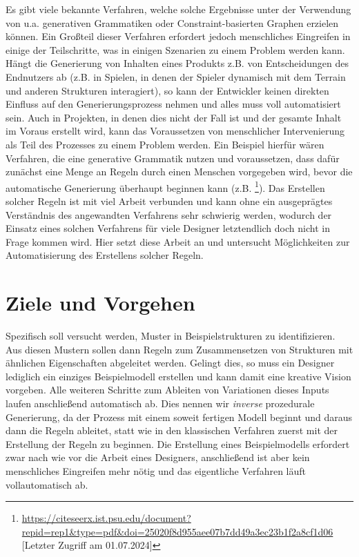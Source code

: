 Es gibt viele bekannte Verfahren, welche solche Ergebnisse unter der Verwendung von u.a. generativen
Grammatiken oder Constraint-basierten Graphen erzielen können. \cite{5_van_der_linden_et_al} Ein Großteil dieser Verfahren erfordert jedoch
menschliches Eingreifen in einige der Teilschritte, was in einigen Szenarien zu einem Problem werden kann. Hängt die Generierung von
Inhalten eines Produkts z.B. von Entscheidungen des Endnutzers ab (z.B. in Spielen, in denen der Spieler dynamisch mit
dem Terrain und anderen Strukturen interagiert), so kann der Entwickler keinen direkten Einfluss auf den Generierungsprozess
nehmen und alles muss voll automatisiert sein. \cite{14_carli_et_al} Auch in Projekten, in denen dies nicht der Fall ist und der gesamte Inhalt
im Voraus erstellt wird, kann das Voraussetzen von menschlicher Intervenierung als Teil des Prozesses zu einem Problem werden.
Ein Beispiel hierfür wären Verfahren, die eine generative Grammatik nutzen und voraussetzen, dass dafür zunächst eine Menge an Regeln
durch einen Menschen vorgegeben wird, bevor die automatische Generierung überhaupt beginnen kann (z.B. \cite{33_adams}\footnote{
\url{https://citeseerx.ist.psu.edu/document?repid=rep1&type=pdf&doi=25020f8d955aee07b7dd49a3ec23b1f2a8cf1d06} [Letzter Zugriff am 01.07.2024]}).
Das Erstellen solcher Regeln ist mit viel Arbeit verbunden und kann ohne ein ausgeprägtes Verständnis des angewandten Verfahrens sehr
schwierig werden, wodurch der Einsatz eines solchen Verfahrens für viele Designer letztendlich doch nicht in Frage kommen wird. Hier
setzt diese Arbeit an und untersucht Möglichkeiten zur Automatisierung des Erstellens solcher Regeln.

\section{Ziele und Vorgehen}
Spezifisch soll versucht werden, Muster in Beispielstrukturen zu identifizieren. Aus diesen Mustern sollen dann Regeln zum Zusammensetzen
von Strukturen mit ähnlichen Eigenschaften abgeleitet werden. Gelingt dies, so muss ein Designer lediglich ein einziges Beispielmodell erstellen und
kann damit eine kreative Vision vorgeben. Alle weiteren Schritte zum Ableiten von Variationen dieses Inputs laufen anschließend automatisch ab.
Dies nennen wir \textit{inverse} prozedurale Generierung,
da der Prozess mit einem soweit fertigen Modell beginnt und daraus dann die Regeln ableitet, statt wie in den klassischen Verfahren zuerst mit
der Erstellung der Regeln zu beginnen. Die Erstellung eines Beispielmodells erfordert zwar nach wie vor die Arbeit eines Designers, anschließend
ist aber kein menschliches Eingreifen mehr nötig und das eigentliche Verfahren läuft vollautomatisch ab.


